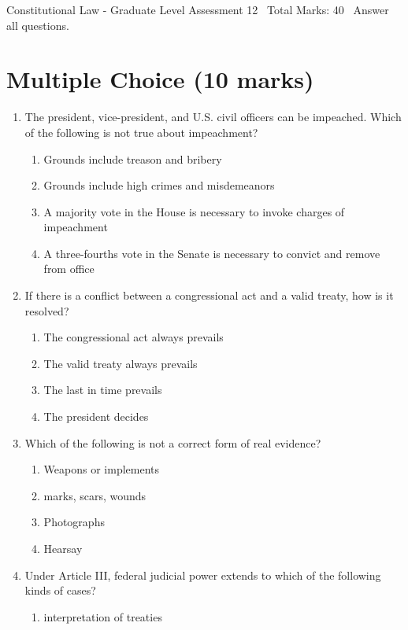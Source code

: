 \documentclass[12pt]{article}
\begin{document}
\begin{center}
Constitutional Law - Graduate Level Assessment 12 \
Total Marks: 40 \
Answer all questions.
\end{center}

\section*{Multiple Choice (10 marks)}
\begin{enumerate}[label=\arabic*.]
\item The president, vice-president, and U.S. civil officers can be impeached. Which of the following is not true about impeachment?
\begin{enumerate}[label=(\alph*)]
    \item Grounds include treason and bribery
    \item Grounds include high crimes and misdemeanors
    \item A majority vote in the House is necessary to invoke charges of impeachment
    \item A three-fourths vote in the Senate is necessary to convict and remove from office
\end{enumerate}
\item If there is a conflict between a congressional act and a valid treaty, how is it resolved?
\begin{enumerate}[label=(\alph*)]
    \item The congressional act always prevails
    \item The valid treaty always prevails
    \item The last in time prevails
    \item The president decides
\end{enumerate}
\item Which of the following is not a correct form of real evidence?
\begin{enumerate}[label=(\alph*)]
    \item Weapons or implements
    \item marks, scars, wounds
    \item Photographs
    \item Hearsay
\end{enumerate}
\item Under Article III, federal judicial power extends to which of the following kinds of cases?
\begin{enumerate}[label=(\alph*)]
    \item interpretation of treaties

\end{enumerate}
\end{enumerate}
\end{document}
